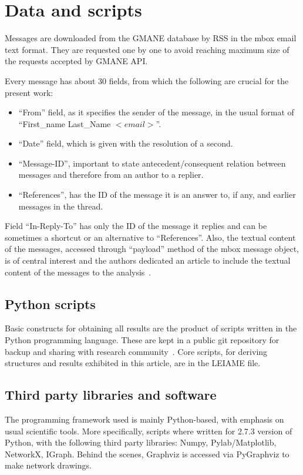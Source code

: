 \documentclass[%
 aip,
 jmp,%
 amsmath,amssymb,
 reprint,%
]{revtex4-1}
\begin{document}
\section{Data and scripts}\label{scripts}
Messages are downloaded from the GMANE database by RSS in the mbox email text format. 
They are requested one by one to avoid reaching maximum size of the requests accepted by
GMANE API.

Every message has about 30 fields, from which the following are crucial
for the present work:
\begin{itemize}
    \item ``From'' field, as it specifies the sender of the message, in the usual format of ``First\_name Last\_Name $<email>$''.
    \item ``Date'' field, which is given with the resolution of a second.
    \item ``Message-ID'', important to state antecedent/consequent relation between messages and therefore from an author to a replier.
    \item ``References'', has the ID of the message it is an answer to, if any, and earlier messages in the thread.
\end{itemize}

Field ``In-Reply-To'' has only the ID of the message it replies and can be sometimes
a shortcut or an alternative to ``References''. Also, the textual content of the messages,
accessed through ``payload'' method of the mbox message object, is of central interest and
the authors dedicated an article to include the textual content of the messages to the analysis~\cite{rcText}.

\subsection{Python scripts}\label{ap:os}
Basic constructs for obtaining all results are the product of scripts written in the Python programming language. These are kept in a public git repository for backup and sharing with research community~\cite{scriptsFim}. Core scripts, for deriving structures and results exhibited in this article, are in the LEIAME file.


\subsection{Third party libraries and software}
The programming framework used 
is mainly Python-based, with emphasis on usual
scientific tools. More specifically,
scripts where written for 2.7.3 version of Python,
with the following third party libraries: Numpy, Pylab/Matplotlib, NetworkX, IGraph.
Behind the scenes, Graphviz is accessed via PyGraphviz to make network drawings.
\end{document}
